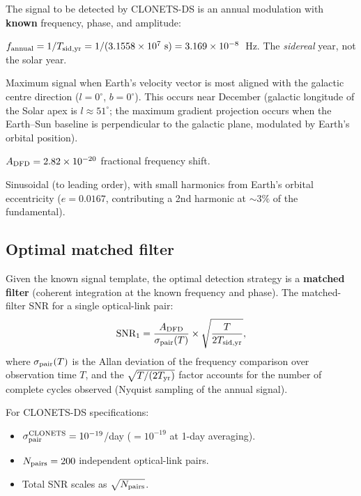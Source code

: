 \documentclass[11pt]{article}
\newcommand{\ee}[1]{\times 10^{#1}}
\begin{document}
The signal to be detected by CLONETS-DS is an annual modulation with
\textbf{known} frequency, phase, and amplitude:
\begin{description}[nosep]
\item[Frequency:] $f_{\rm annual} = 1/T_{\rm sid,yr}
  = 1/(3.1558\ee{7}~\text{s}) = 3.169\ee{-8}$~Hz.
  The \emph{sidereal} year, not the solar year.
\item[Phase:] Maximum signal when Earth's velocity vector is most aligned
  with the galactic centre direction ($l = 0^\circ$, $b = 0^\circ$).
  This occurs near December (galactic longitude of the Solar apex is
  $l \approx 51^\circ$; the maximum gradient projection occurs when
  the Earth--Sun baseline is perpendicular to the galactic plane,
  modulated by Earth's orbital position).
\item[Amplitude:] $A_{\rm DFD} = 2.82\ee{-20}$ fractional frequency shift.
\item[Waveform:] Sinusoidal (to leading order), with small harmonics
  from Earth's orbital eccentricity ($e = 0.0167$, contributing
  a 2nd harmonic at $\sim 3\%$ of the fundamental).
\end{description}

\subsection{Optimal matched filter}

Given the known signal template, the optimal detection strategy is a
\textbf{matched filter} (coherent integration at the known frequency
and phase). The matched-filter SNR for a single optical-link pair:
\begin{equation}
\text{SNR}_1 = \frac{A_{\rm DFD}}{\sigma_{\rm pair}(T)}
\times\sqrt{\frac{T}{2T_{\rm sid,yr}}},
\label{eq:SNR-matched}
\end{equation}
where $\sigma_{\rm pair}(T)$ is the Allan deviation of the frequency
comparison over observation time $T$, and the $\sqrt{T/(2T_{\rm yr})}$
factor accounts for the number of complete cycles observed (Nyquist
sampling of the annual signal).

For CLONETS-DS specifications:
\begin{itemize}[nosep]
\item $\sigma_{\rm pair}^{\rm CLONETS} = 10^{-19}$/day ($= 10^{-19}$
  at 1-day averaging).
\item $N_{\rm pairs} = 200$ independent optical-link pairs.
\item Total SNR scales as $\sqrt{N_{\rm pairs}}$.
\end{itemize}
\end{document}
